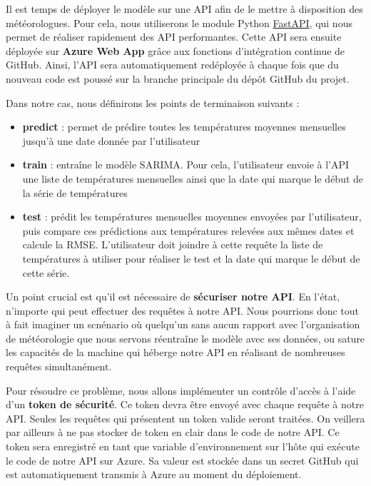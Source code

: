 \documentclass[french]{article}
\begin{document}
    Il est temps de déployer le modèle sur une API afin de le mettre à disposition des météorologues. Pour cela, nous utiliserons le module Python \href{https://fastapi.tiangolo.com/}{FastAPI}, qui nous permet de réaliser rapidement des API performantes. Cette API sera ensuite déployée sur \textbf{Azure Web App} grâce aux fonctions d'intégration continue de GitHub. Ainsi, l'API sera automatiquement redéployée à chaque fois que du nouveau code est poussé sur la branche principale du dépôt GitHub du projet.

    Dans notre cas, nous définirons les points de terminaison suivants :
    \begin{itemize}
        \item \textbf{predict} : permet de prédire toutes les températures moyennes mensuelles jusqu'à une date donnée par l'utilisateur
        \item \textbf{train} : entraîne le modèle SARIMA. Pour cela, l'utilisateur envoie à l'API une liste de températures mensuelles ainsi que la date qui marque le début de la série de températures
        \item \textbf{test} : prédit les températures mensuelles moyennes envoyées par l'utilisateur, puis compare ces prédictions aux températures relevées aux mêmes dates et calcule la RMSE. L'utilisateur doit joindre à cette requête la liste de températures à utiliser pour réaliser le test et la date qui marque le début de cette série.
    \end{itemize}

    Un point crucial est qu'il est nécessaire de \textbf{sécuriser notre API}. En l'état, n'importe qui peut effectuer des requêtes à notre API. Nous pourrions donc tout à fait imaginer un scnénario où quelqu'un sans aucun rapport avec l'organisation de météorologie que nous servons réentraîne le modèle avec ses données, ou sature les capacités de la machine qui héberge notre API en réalisant de nombreuses requêtes simultanément.

    Pour résoudre ce problème, nous allons implémenter un contrôle d'accès à l'aide d'un \textbf{token de sécurité}. Ce token devra être envoyé avec chaque requête à notre API. Seules les requêtes qui présentent un token valide seront traitées. On veillera par ailleurs à ne pas stocker de token en clair dans le code de notre API. Ce token sera enregistré en tant que variable d'environnement sur l'hôte qui exécute le code de notre API sur Azure. Sa valeur est stockée dans un secret GitHub qui est automatiquement transmis à Azure au moment du déploiement.
\end{document}
